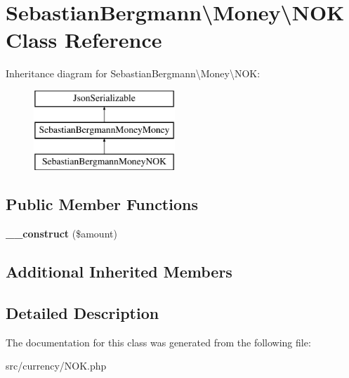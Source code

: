 \hypertarget{classSebastianBergmann_1_1Money_1_1NOK}{}\section{Sebastian\+Bergmann\textbackslash{}Money\textbackslash{}N\+O\+K Class Reference}
\label{classSebastianBergmann_1_1Money_1_1NOK}
Inheritance diagram for Sebastian\+Bergmann\textbackslash{}Money\textbackslash{}N\+O\+K\+:\begin{figure}[H]
\begin{center}
\leavevmode
\includegraphics[height=3.000000cm]{classSebastianBergmann_1_1Money_1_1NOK}
\end{center}
\end{figure}
\subsection*{Public Member Functions}
\begin{DoxyCompactItemize}
\item 
\hypertarget{classSebastianBergmann_1_1Money_1_1NOK_a47db1ac6a262f7fe8f4a1ba914ba0cdd}{}{\bfseries \+\_\+\+\_\+construct} (\$amount)\label{classSebastianBergmann_1_1Money_1_1NOK_a47db1ac6a262f7fe8f4a1ba914ba0cdd}

\end{DoxyCompactItemize}
\subsection*{Additional Inherited Members}


\subsection{Detailed Description}


The documentation for this class was generated from the following file\+:\begin{DoxyCompactItemize}
\item 
src/currency/N\+O\+K.\+php\end{DoxyCompactItemize}
